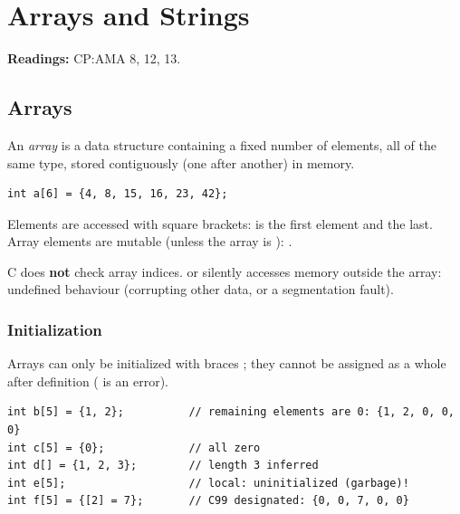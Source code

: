 \chapter{Arrays and Strings}

\textbf{Readings:} CP:AMA 8, 12, 13.

\section{Arrays}

\begin{definition}
An \emph{array} is a data structure containing a fixed number of elements, all of the same type,
stored contiguously (one after another) in memory.
\end{definition}

\begin{lstlisting}[style=c]
int a[6] = {4, 8, 15, 16, 23, 42};
\end{lstlisting}
\begin{center}
\end{center}
Elements are accessed with square brackets:  is the first element and
 the last. Array elements are mutable (unless the array is ):
.

\begin{important}
C does \textbf{not} check array indices.  or  silently accesses memory
outside the array: undefined behaviour (corrupting other data, or a segmentation fault).
\end{important}

\subsection{Initialization}

Arrays can only be initialized with braces \code{\{\}}; they cannot be assigned as a whole
after definition ( is an error).
\begin{lstlisting}[style=c]
int b[5] = {1, 2};          // remaining elements are 0: {1, 2, 0, 0, 0}
int c[5] = {0};             // all zero
int d[] = {1, 2, 3};        // length 3 inferred
int e[5];                   // local: uninitialized (garbage)!
int f[5] = {[2] = 7};       // C99 designated: {0, 0, 7, 0, 0}
\end{lstlisting}

